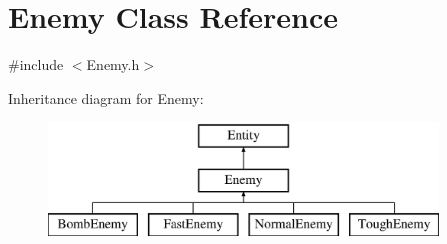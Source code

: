 \hypertarget{class_enemy}{\section{Enemy Class Reference}
\label{class_enemy}
}


{\ttfamily \#include $<$Enemy.\+h$>$}

Inheritance diagram for Enemy\+:\begin{figure}[H]
\begin{center}
\leavevmode
\includegraphics[height=3.000000cm]{class_enemy}
\end{center}
\end{figure}
